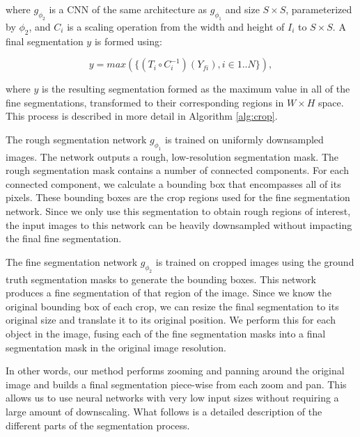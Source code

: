 where $g_{\phi_2}$ is a CNN of the same architecture as $g_{\phi_1}$ and size $S \times S$, parameterized by $\phi_2$, and $C_i$ is a scaling operation from the width and height of $I_i$ to $S \times S$. A final segmentation $y$ is formed using:

\begin{equation}
y = max(\{(T_i \circ C^{-1}_i)(Y_{fi}), i \in 1..N\}),
\end{equation}

where $y$ is the resulting segmentation formed as the maximum value in all of the fine segmentations, transformed to their corresponding regions in $W \times H$ space. This process is described in more detail in Algorithm \ref{alg:crop}. 

The rough segmentation network $g_{\phi_1}$ is trained on uniformly downsampled images. The network outputs a rough, low-resolution segmentation mask. The rough segmentation mask contains a number of connected components. For each connected component, we calculate a bounding box that encompasses all of its pixels. These bounding boxes are the crop regions used for the fine segmentation network. Since we only use this segmentation to obtain rough regions of interest, the input images to this network can be heavily downsampled without impacting the final fine segmentation.

The fine segmentation network $g_{\phi_2}$ is trained on cropped images using the ground truth segmentation masks to generate the bounding boxes. This network produces a fine segmentation of that region of the image. Since we know the original bounding box of each crop, we can resize the final segmentation to its original size and translate it to its original position. We perform this for each object in the image, fusing each of the fine segmentation masks into a final segmentation mask in the original image resolution.

In other words, our method performs zooming and panning around the original image and builds a final segmentation piece-wise from each zoom and pan. This allows us to use neural networks with very low input sizes without requiring a large amount of downscaling. What follows is a detailed description of the different parts of the segmentation process.

